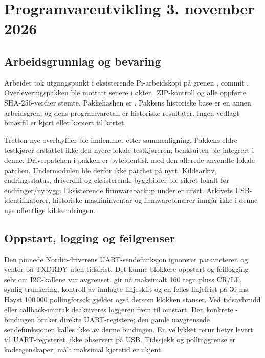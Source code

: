 \chapter{Programvareutvikling 3. november 2026}
\label{ch:software-only}

\section{Arbeidsgrunnlag og bevaring}
Arbeidet tok utgangspunkt i eksisterende Pi-arbeidskopi på grenen
, commit
. Overleveringspakken 
ble mottatt senere i økten. ZIP-kontroll og alle oppførte SHA-256-verdier
stemte. Pakkehashen er
.
Pakkens historiske base  er en annen arbeidsgren, og dens
programvaretall er historiske resultater. Ingen vedlagt binærfil er kjørt
eller kopiert til kortet.

Tretten nye overlayfiler ble innlemmet etter sammenligning.
Pakkens eldre testkjører erstattet ikke den nyere lokale testkjøreren;
benksuiten ble integrert i denne. Driverpatchen i pakken er byteidentisk
med den allerede anvendte lokale patchen. Undermodulen ble derfor ikke
patchet på nytt. Kildearkiv, endringsstatus, driverdiff og eksisterende
byggbilder ble sikret lokalt før endringer/nybygg. Eksisterende
firmwarebackup under  er urørt. Arkivets
USB-identifikatorer, historiske maskininventar og firmwarebinærer inngår
ikke i denne nye offentlige kildeendringen.

\section{Oppstart, logging og feilgrenser}
Den pinnede Nordic-driverens UART-sendefunksjon ignorerer parameteren
 og venter på TXDRDY uten tidsfrist. Det kunne blokkere
oppstart og feillogging selv om I2C-kallene var avgrenset.
 gir nå maksimalt 160 tegn pluss CR/LF,
synlig trunkering, kontroll av innlagte linjeskift og en felles linjefrist
på 30 ms. Høyst 100\,000 pollingforsøk gjelder også dersom klokken stanser.
Ved tidsavbrudd eller callback-unntak deaktiveres loggeren frem til omstart.
Den konkrete -bindingen bruker direkte UART-registere;
den gamle uavgrensede sendefunksjonen kalles ikke av denne bindingen.
En vellykket retur betyr levert til UART-registeret, ikke observert på USB.
Tidssjekk og pollinggrense er kodeegenskaper; målt maksimal kjøretid er ukjent.

